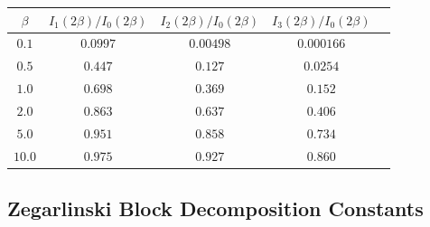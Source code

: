 \begin{corollary}
\begin{center}
\begin{tabular}{|c|c|c|c|c|}
\hline
$\beta$ & $I_1(2\beta)/I_0(2\beta)$ & $I_2(2\beta)/I_0(2\beta)$ & $I_3(2\beta)/I_0(2\beta)$ \\
\hline
$0.1$ & $0.0997$ & $0.00498$ & $0.000166$ \\
\hline
$0.5$ & $0.447$ & $0.127$ & $0.0254$ \\
\hline
$1.0$ & $0.698$ & $0.369$ & $0.152$ \\
\hline
$2.0$ & $0.863$ & $0.637$ & $0.406$ \\
\hline
$5.0$ & $0.951$ & $0.858$ & $0.734$ \\
\hline
$10.0$ & $0.975$ & $0.927$ & $0.860$ \\
\hline
\end{tabular}
\end{center}
\end{corollary}

\subsection{Zegarlinski Block Decomposition Constants}

